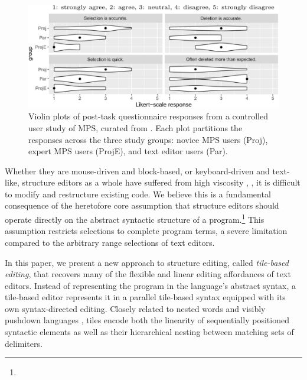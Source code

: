 \begin{figure}[b]
  \centering
  \includegraphics[width=\columnwidth]{img/mps-violin-plots.png}
  \caption{Violin plots of post-task questionnaire responses
  from a controlled user study of MPS, curated from \cite{ProjEfficiency}.
  Each plot partitions the responses across the three study groups:
  novice MPS users (Proj), expert MPS users (ProjE),
  and text editor users (Par).
  }
  \label{fig:mps-violin-plots}
\end{figure}

Whether they are mouse-driven and block-based,
or keyboard-driven and text-like,
structure editors as a whole have suffered
from high viscosity \cite{cog-dim},
\ie, it is difficult to modify
and restructure existing code.
We believe this is a fundamental consequence
of the heretofore core assumption that structure editors
should operate directly on the abstract syntactic structure
of a program.\footnote{}
This assumption restricts selections to complete
program terms, a severe limitation compared to
the arbitrary range selections of text editors.

In this paper, we present a new approach to structure
editing, called \emph{tile-based editing}, that
recovers many of the flexible and linear editing
affordances of text editors.
Instead of representing the program in the language's
abstract syntax, a tile-based editor represents it
in a parallel tile-based syntax equipped with its own
syntax-directed editing.
Closely related to nested words \cite{nested-words}
and visibly pushdown languages \cite{visibly-pushdown-langs},
tiles encode both the linearity of sequentially
positioned syntactic elements as well as
their hierarchical nesting between matching sets
of delimiters.



